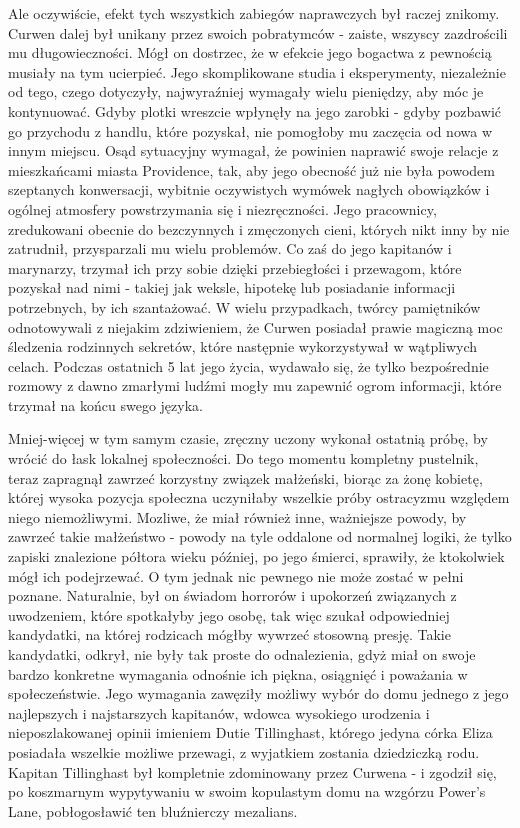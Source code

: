 Ale oczywiście, efekt tych wszystkich zabiegów naprawczych był raczej znikomy. Curwen dalej był unikany przez swoich pobratymców - zaiste, wszyscy zazdrościli mu długowieczności. Mógł on dostrzec, że w efekcie jego bogactwa z pewnością musiały na tym ucierpieć. Jego skomplikowane studia i eksperymenty, niezależnie od tego, czego dotyczyły, najwyraźniej wymagały wielu pieniędzy, aby móc je kontynuować. Gdyby plotki wreszcie wpłynęły na jego zarobki - gdyby pozbawić go przychodu z handlu, które pozyskał, nie pomogłoby mu zaczęcia od nowa w innym miejscu. Osąd sytuacyjny wymagał, że powinien naprawić swoje relacje z mieszkańcami miasta Providence, tak, aby jego obecność już nie była powodem szeptanych konwersacji, wybitnie oczywistych wymówek nagłych obowiązków i ogólnej atmosfery powstrzymania się i niezręczności. Jego pracownicy, zredukowani obecnie do bezczynnych i zmęczonych cieni, których nikt inny by nie zatrudnił, przysparzali mu wielu problemów. Co zaś do jego kapitanów i marynarzy, trzymał ich przy sobie dzięki przebiegłości i przewagom, które pozyskał nad nimi - takiej jak weksle, hipotekę lub posiadanie informacji potrzebnych, by ich szantażować. W wielu przypadkach, twórcy pamiętników odnotowywali z niejakim zdziwieniem, że Curwen posiadał prawie magiczną moc śledzenia rodzinnych sekretów, które następnie wykorzystywał w wątpliwych celach. Podczas ostatnich 5 lat jego życia, wydawało się, że tylko bezpośrednie rozmowy z dawno zmarłymi ludźmi mogły mu zapewnić ogrom informacji, które trzymał na końcu swego języka. 

Mniej-więcej w tym samym czasie, zręczny uczony wykonał ostatnią próbę, by wrócić do łask lokalnej społeczności. Do tego momentu kompletny pustelnik, teraz zapragnął zawrzeć korzystny związek małżeński, biorąc za żonę kobietę, której wysoka pozycja społeczna uczyniłaby wszelkie próby ostracyzmu względem niego niemożliwymi. Mozliwe, że miał również inne, ważniejsze powody, by zawrzeć takie małżeństwo - powody na tyle oddalone od normalnej logiki, że tylko zapiski znalezione półtora wieku później, po jego śmierci, sprawiły, że ktokolwiek mógł ich podejrzewać. O tym jednak nic pewnego nie może zostać w pełni poznane. Naturalnie, był on świadom horrorów i upokorzeń związanych z uwodzeniem, które spotkałyby jego osobę, tak więc szukał odpowiedniej kandydatki, na której rodzicach mógłby wywrzeć stosowną presję. Takie kandydatki, odkrył, nie były tak proste do odnalezienia, gdyż miał on swoje bardzo konkretne wymagania odnośnie ich piękna, osiągnięć i poważania w społeczeństwie. Jego wymagania zawęziły możliwy wybór do domu jednego z jego najlepszych i najstarszych kapitanów, wdowca wysokiego urodzenia i nieposzlakowanej opinii imieniem Dutie Tillinghast, którego jedyna córka Eliza posiadała wszelkie możliwe przewagi, z wyjatkiem zostania dziedziczką rodu. Kapitan Tillinghast był kompletnie zdominowany przez Curwena - i zgodził się, po koszmarnym wypytywaniu w swoim kopulastym domu na wzgórzu Power's Lane, pobłogosławić ten bluźnierczy mezalians. 

